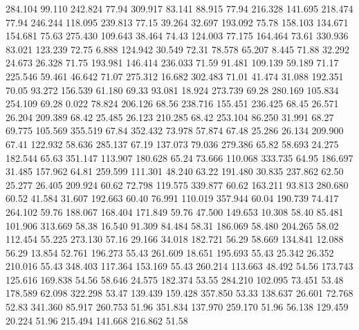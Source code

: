  284.104   99.110  242.824        77.94
 309.917   83.141   88.915        77.94
 216.328  141.695  218.474        77.94
 246.244  118.095  239.813        77.15
  39.264   32.697  193.092        75.78
 158.103  134.671  154.681        75.63
 275.430  109.643   38.464        74.43
 124.003   77.175  164.464        73.61
 330.936   83.021  123.239        72.75
   6.888  124.942   30.549        72.31
  78.578   65.207    8.445        71.88
  32.292   24.673   26.328        71.75
 193.981  146.414  236.033        71.59
  91.481  109.139   59.189        71.17
 225.546   59.461   46.642        71.07
 275.312   16.682  302.483        71.01
  41.474   31.088  192.351        70.05
  93.272  156.539   61.180        69.33
  93.081   18.924  273.739        69.28
 280.169  105.834  254.109        69.28
   0.022   78.824  206.126        68.56
 238.716  155.451  236.425        68.45
  26.571   26.204  209.389        68.42
  25.485   26.123  210.285        68.42
 253.104   86.250   31.991        68.27
  69.775  105.569  355.519        67.84
 352.432   73.978   57.874        67.48
  25.286   26.134  209.900        67.41
 122.932   58.636  285.137        67.19
 137.073   79.036  279.386        65.82
  58.693   24.275  182.544        65.63
 351.147  113.907  180.628        65.24
  73.666  110.068  333.735        64.95
 186.697   31.485  157.962        64.81
 259.599  111.301   48.240        63.22
 191.480   30.835  237.862        62.50
  25.277   26.405  209.924        60.62
  72.798  119.575  339.877        60.62
 163.211   93.813  280.680        60.52
  41.584   31.607  192.663        60.40
  76.991  110.019  357.944        60.04
 190.739   74.417  264.102        59.76
 188.067  168.404  171.849        59.76
  47.500  149.653   10.308        58.40
  85.481  101.906  313.669        58.38
  16.540   91.309   84.484        58.31
 186.069   58.480  204.265        58.02
 112.454   55.225  273.130        57.16
  29.166   34.018  182.721        56.29
  58.669  134.841   12.088        56.29
  13.854   52.761  196.273        55.43
 261.609   18.651  195.693        55.43
  25.342   26.352  210.016        55.43
 348.403  117.364  153.169        55.43
 260.214  113.663   48.492        54.56
 173.743  125.616  169.838        54.56
  58.646   24.575  182.374        53.55
 284.210  102.095   73.451        53.48
 178.589   62.098  322.298        53.47
 139.439  159.428  357.850        53.33
 138.637   26.601   72.768        52.83
 341.360   85.917  260.753        51.96
 351.834  137.970  259.170        51.96
  56.138  129.459   20.224        51.96
 215.494  141.668  216.862        51.58
